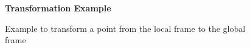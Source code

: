 \documentclass[12pt,letterpaper,boxed]{hmcpset}
\begin{document}
\begin{figure}[H]
	\centering
	\textbf{Transformation Example}\par\medskip
	\caption{Example to transform a point from the local frame to the global frame}
	\label{fig:example1}
\end{figure}

\end{document}
